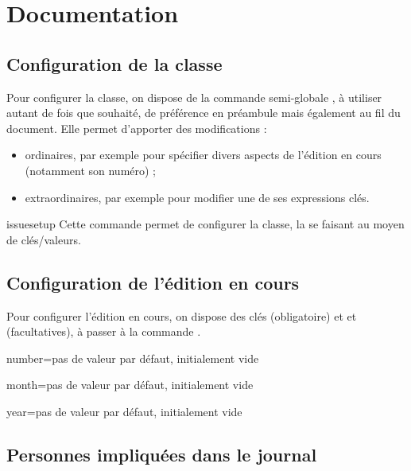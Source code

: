 
\chapter{Documentation}
\label{cha:documentation}

\section{Configuration de la classe}

Pour configurer la classe, on dispose de la commande semi-globale
, à utiliser autant de fois que souhaité, de préférence en
préambule mais également au fil du document. Elle permet d'apporter des
modifications :
\begin{itemize}
\item ordinaires, par exemple pour spécifier divers aspects de l'édition en
  cours (notamment son numéro) ;
\item extraordinaires, par exemple pour modifier une de ses expressions clés.
\end{itemize}

\begin{docCommand}{issuesetup}{}
  Cette commande permet de configurer la classe, la  se
  faisant au moyen de clés/valeurs.
\end{docCommand}

\section{Configuration de l'édition en cours}

Pour configurer l'édition en cours, on dispose des clés 
(obligatoire) et  et  (facultatives), à passer à la
commande .

\begin{docKey}{number}{=}{pas de valeur par défaut,
    initialement vide}
\end{docKey}

\begin{docKey}{month}{=}{pas de valeur par défaut,
    initialement vide}
\end{docKey}

\begin{docKey}{year}{=}{pas de valeur par défaut,
    initialement vide}
\end{docKey}

\section{Personnes impliquées dans le journal}
\label{sec:pers-impl-dans}

